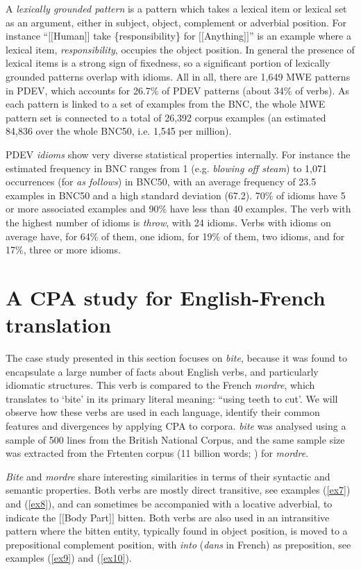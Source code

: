 \documentclass[output=paper]{langsci/langscibook}
\begin{document}
A \textit{lexically grounded pattern} is a pattern
which takes a lexical item or lexical set as an argument, either in
subject, object, complement or adverbial position. For instance
“$[$$[$Human$]$$]$ take \{responsibility\} for $[$$[$Anything$]$$]$” is an example
where a lexical item,  \textit{responsibility}, occupies the object position.
In general the presence of lexical items is a strong sign of fixedness,
so a significant portion of lexically grounded patterns overlap with
idioms. All in all, there are 1,649 MWE patterns in PDEV, which
accounts for 26.7\% of PDEV patterns (about 34\% of verbs). As each
pattern is linked to a set of examples from the BNC, the whole MWE
pattern set is connected to a total of 26,392 corpus examples (an
estimated 84,836 over the whole BNC50, i.e. 1,545 per million).



PDEV \textit{idioms} show very diverse statistical
properties internally. For instance the estimated frequency in BNC
ranges from 1 (e.g.  \textit{blowing off steam}) to 1,071 occurrences (for  \textit{as
follows}) in BNC50, with an average frequency of 23.5 examples in BNC50
and a high standard deviation (67.2). 70\% of idioms have 5 or more
associated examples and 90\% have less than 40 examples. The verb with
the highest number of idioms is \textit{throw}, with 24
idioms. Verbs with idioms on average have, for 64\% of them, one idiom,
for 19\% of them, two idioms, and for 17\%, three or more idioms. 

\section{A CPA study for English-French translation}
The case study presented in this section focuses on  \textit{bite}, because it
was found to encapsulate a large number of facts about English verbs,
and particularly idiomatic structures. This verb is compared to the
French  \textit{mordre}, which translates to `bite' in its primary literal
meaning: ``using teeth to cut'. We will observe how these verbs are used
in each language, identify their common features and divergences by
applying CPA to corpora. \textit{bite} was analysed using a sample of 500
lines from the British National Corpus, and the same sample size was
extracted from the Frtenten corpus (11 billion words; \citealt{jakubicek2013}) for \textit{mordre}.



\textit{Bite} and \textit{mordre} share interesting similarities in terms of their
syntactic and semantic properties. Both verbs are mostly direct
transitive, see examples (\ref{ex7}) and (\ref{ex8}), and can sometimes be accompanied with a
locative adverbial, to indicate the $[$$[$Body Part$]$$]$ bitten. Both verbs
are also used in an intransitive pattern where the bitten entity,
typically found in object position, is moved to a prepositional
complement position, with \textit{into} (\textit{dans} in French) as preposition, see examples (\ref{ex9}) and (\ref{ex10}).
\end{document}
